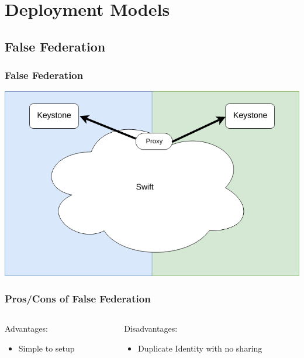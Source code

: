 \documentclass[aspectratio=169,11pt,hyperref={colorlinks=true}]{beamer}
\begin{document}
\section{Deployment Models}

\subsection{False Federation}
\begin{frame}
\frametitle{False Federation}
\centering
\includegraphics[width=.775\textwidth]{swift-federation-false.png}
\end{frame}

\begin{frame}
\frametitle{Pros/Cons of False Federation}
\begin{columns}[T]
    \begin{column}{.48\textwidth}
        Advantages:
        \begin{itemize}
            \item Simple to setup
        \end{itemize}
    \end{column}
    \begin{column}{.48\textwidth}
        Disadvantages:
        \begin{itemize}
            \item Duplicate Identity with no sharing
        \end{itemize}
    \end{column}
\end{columns}
\end{frame}
\end{document}
